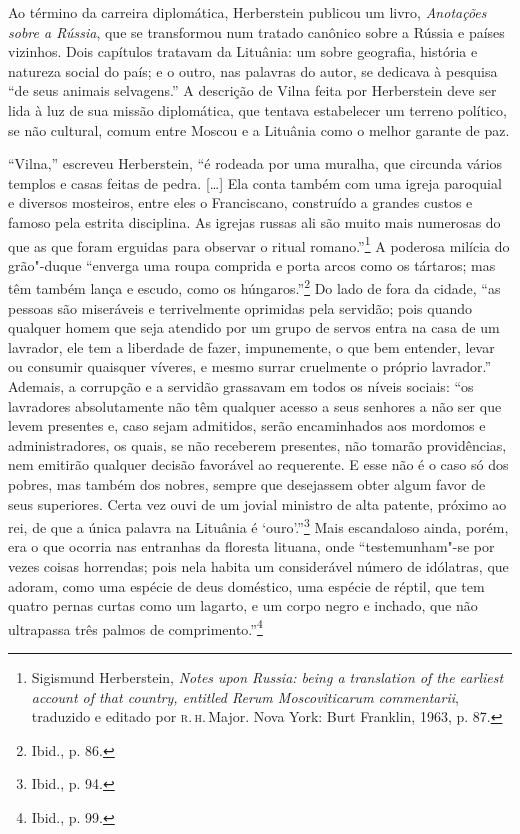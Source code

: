 Ao término da carreira diplomática, Herberstein publicou um livro,
\textit{Anotações sobre a Rússia}, que se transformou num tratado canônico
sobre a Rússia e países vizinhos. Dois capítulos tratavam da Lituânia:
um sobre geografia, história e natureza social do país; e o outro, nas
palavras do autor, se dedicava à pesquisa ``de seus animais selvagens.''
A descrição de Vilna feita por Herberstein deve ser lida à luz de sua
missão diplomática, que tentava estabelecer um terreno político, se não
cultural, comum entre Moscou e a Lituânia como o melhor garante de paz.

``Vilna,'' escreveu Herberstein, ``é rodeada por uma muralha, que
circunda vários templos e casas feitas de pedra. {[}\ldots{}{]} Ela
conta também com uma igreja paroquial e diversos mosteiros, entre eles o
Franciscano, construído a grandes custos e famoso pela estrita
disciplina. As igrejas russas ali são muito mais numerosas do que as que
foram erguidas para observar o ritual romano.''\footnote{Sigismund Herberstein, \textit{Notes upon Russia: being a translation of the earliest account of that country, entitled Rerum Moscoviticarum commentarii}, traduzido e editado por \textsc{r.\,h.}\,Major. Nova York: Burt Franklin, 1963, p. 87.} A poderosa milícia do grão"-duque ``enverga uma roupa comprida e porta arcos como os tártaros; mas têm também lança e
escudo, como os húngaros.''\footnote{Ibid., p. 86.} Do lado de fora da
cidade, ``as pessoas são miseráveis e terrivelmente oprimidas pela
servidão; pois quando qualquer homem que seja atendido por um grupo de
servos entra na casa de um lavrador, ele tem a liberdade de fazer,
impunemente, o que bem entender, levar ou consumir quaisquer víveres, e
mesmo surrar cruelmente o próprio lavrador.'' Ademais, a corrupção e a
servidão grassavam em todos os níveis sociais: ``os lavradores
absolutamente não têm qualquer acesso a seus senhores a não ser que
levem presentes e, caso sejam admitidos, serão encaminhados aos mordomos
e administradores, os quais, se não receberem presentes, não tomarão
providências, nem emitirão qualquer decisão favorável ao requerente. E
esse não é o caso só dos pobres, mas também dos nobres, sempre que
desejassem obter algum favor de seus superiores. Certa vez ouvi de um
jovial ministro de alta patente, próximo ao rei, de que a única palavra
na Lituânia é `ouro'.''\footnote{Ibid., p. 94.} Mais escandaloso ainda,
porém, era o que ocorria nas entranhas da floresta lituana, onde
``testemunham"-se por vezes coisas horrendas; pois nela habita um
considerável número de idólatras, que adoram, como uma espécie de deus
doméstico, uma espécie de réptil, que tem quatro pernas curtas como um
lagarto, e um corpo negro e inchado, que não ultrapassa três palmos de
comprimento.''\footnote{Ibid., p. 99.}

